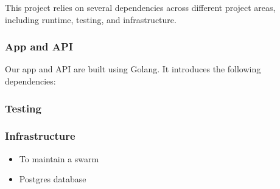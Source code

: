This project relies on several dependencies across different project areas, including runtime, testing, and infrastructure.

\subsubsection{App and API}
Our app and API are built using Golang. It introduces the following dependencies:

\subsubsection{Testing}

\subsubsection{Infrastructure}
\begin{itemize}
    \item To maintain a swarm 
    \item Postgres database
\end{itemize}